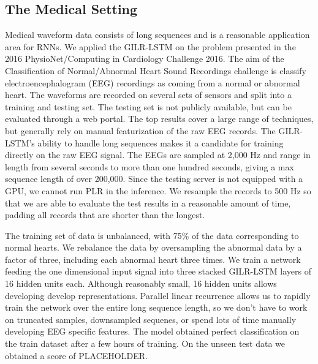 \documentclass{article}
\begin{document}
\subsection{The Medical Setting}
Medical waveform data consists of long sequences and is a reasonable application area for RNNs.
We applied the GILR-LSTM
on the problem presented in the 2016 PhysioNet/Computing in
Cardiology Challenge 2016.  The aim of the Classification of Normal/Abnormal
Heart Sound Recordings challenge is classify electroencephalogram (EEG) recordings
as coming from a normal or abnormal heart.
The waveforms are recorded on several sets of sensors
and split into a training and testing set. The testing set is not
publicly available, but can be evaluated through a web portal. The top results
cover a large range of techniques, but generally rely on manual featurization of the
raw EEG records. The GILR-LSTM's ability to handle long sequences makes it a
candidate for training directly on the raw EEG signal.
The EEGs are sampled at 2,000 Hz
and range in length from several seconds to more than one hundred seconds,
giving a max sequence length of over 200,000. Since the testing server is not
equipped with a GPU, we cannot run PLR in the inference. We resample the
records to 500 Hz so that we are able to evaluate the test results in a
reasonable amount of time, padding all records that are shorter than the longest.

The training set of data is unbalanced, with 75\% of the data corresponding to
normal hearts. We rebalance the data by oversampling the abnormal data by a factor
of three, including each abnormal heart three times. We train a network feeding
the one dimensional input signal into three stacked GILR-LSTM layers of 16 hidden units each.
Although reasonably small, 16 hidden units allows developing
develop representations. Parallel linear recurrence allows us to rapidly train the network
over the entire long sequence length, so we don't have to work on truncated samples,
downsampled sequenes, or
spend lots of time manually developing EEG specific features.
The model obtained perfect classification on the train dataset after
a few hours  of training.
On the unseen test data we obtained a score of PLACEHOLDER.

\end{document}
